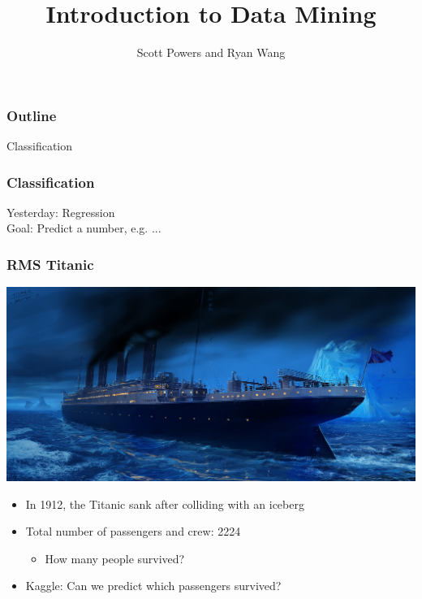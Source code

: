 \documentclass{beamer}
\title{Introduction to Data Mining}
\author{Scott Powers and Ryan Wang}
\begin{document}
\begin{frame}
\titlepage
\end{frame}

\begin{frame}
\frametitle{Outline}
Classification
\end{frame}

\begin{frame}
\frametitle{Classification}
Yesterday: Regression\\
Goal: Predict a number, e.g. ...
\end{frame}

\begin{frame}
\frametitle{RMS Titanic}
\begin{center}
\includegraphics[scale = .15]{titanic.jpg}
\end{center}
\begin{itemize}
\item In 1912, the Titanic sank after colliding with an iceberg
\item Total number of passengers and crew: 2224
\begin{itemize}
\item How many people survived? 
\end{itemize}
\item Kaggle: Can we predict which passengers survived?
\end{itemize}
\end{frame}
\end{document}
